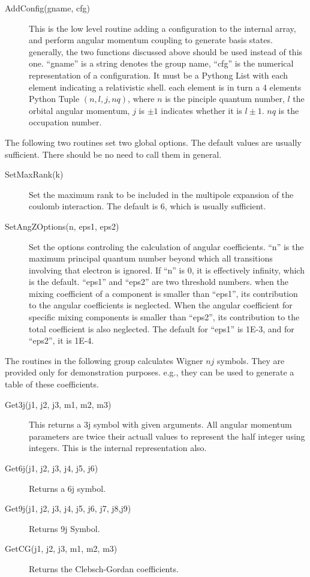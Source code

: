 \documentclass[12pt]{article}
\begin{document}
\begin{description}
\item[AddConfig(gname, cfg)] 
This is the low level routine adding a
configuration to the internal array, and perform angular momentum coupling to
generate basis states. generally, the two functions discussed above should be
used instead of this one. ``gname'' is a string denotes the group name, 
``cfg'' is the numerical representation of a configuration. It must be a
Pythong List with 
each element indicating a relativistic shell. each element is in turn a 4
elements Python Tuple $(n, l, j, nq)$, where $n$ is the pinciple quantum
number, $l$ the orbital angular momentum, $j$ is $\pm 1$ indicates whether it
is $l\pm 1$. $nq$ is the occupation number.

\end{description}

The following two routines set two global options. The default values are
usually sufficient. There should be no need to call them in general. 
\begin{description}
\item[SetMaxRank(k)] 
Set the maximum rank to be included in the multipole
expansion of the coulomb interaction. The default is 6, which is usually
sufficient. 

\item[SetAngZOptions(n, eps1, eps2)] 
Set the options controling the
calculation of angular coefficients. ``n'' is the maximum principal quantum
number beyond which all transitions involving that electron is ignored. If
``n'' is 0, it is effectively infinity, which is the default. 
``eps1'' and ``eps2'' are two threshold numbers. when
the mixing coefficient of a component is smaller than ``eps1'', its
contribution to the angular coefficients is neglected. When the angular
coefficient for specific mixing components is smaller than ``eps2'', its
contribution to the total coefficient is also neglected. The default for
``eps1'' is 1E-3, and for ``eps2'', it is 1E-4. 

\end{description}

The routines in the following group calculates Wigner $nj$ symbols. They are
provided only for demonstration purposes. e.g., they can be used to generate a
table of these coefficients.
\begin{description}
\item[Get3j(j1, j2, j3, m1, m2, m3)] This returns a 3j symbol with given
arguments. All angular momentum parameters are twice their actuall values to
represent the half integer using integers. This is the internal
representation also. 

\item[Get6j(j1, j2, j3, j4, j5, j6)] Returns a 6j symbol.

\item[Get9j(j1, j2, j3, j4, j5, j6, j7, j8,j9)] Returns 9j Symbol.

\item[GetCG(j1, j2, j3, m1, m2, m3)] Returns the Clebsch-Gordan coefficients.

\end{description}
\end{document}
